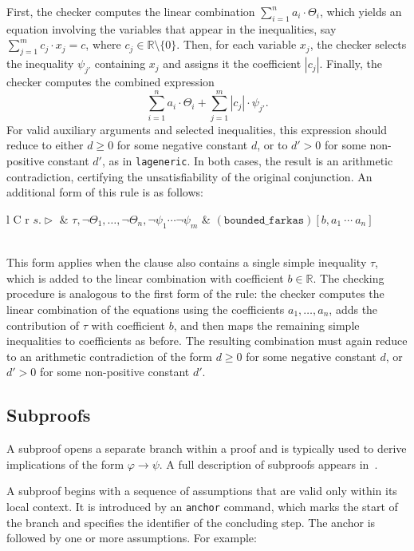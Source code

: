 First, the checker computes the linear combination
$\sum_{i=1}^{n} a_i \cdot \Theta_i$, which yields an equation involving the variables that appear in the inequalities, say
$\sum_{j=1}^{m} c_j \cdot x_j = c$,
where $c_j \in \mathbb{R}\setminus\{0\}$. Then, for each variable $x_j$, the checker selects the inequality $\psi_{j'}$ containing $x_j$ and assigns it the coefficient $|c_j|$. Finally, the checker computes the combined expression
\[
\sum_{i=1}^{n} a_i \cdot \Theta_i
+
\sum_{j=1}^{m} |c_j| \cdot \psi_{j'} .
\]
For valid auxiliary arguments and selected inequalities, this expression should reduce to either $d \geq 0$ for some negative constant $d$, or to $d' > 0$ for some non-positive constant $d'$, as in \texttt{la\textunderscore generic}. In both cases, the result is an arithmetic contradiction, certifying the unsatisfiability of the original conjunction.
An additional form of this rule is as follows:

\noindent\begin{tabularx}{\linewidth}{ l C r }
	$s.\triangleright$ & 
	$\tau,\lnot\Theta_1,\dots,\lnot\Theta_n,\lnot\psi_1\cdots\lnot\psi_m$ & 
	${\mathtt{(bounded\_farkas)}[b,a_1 \: \cdots \: a_n]}$
\end{tabularx} \\

This form applies when the clause also contains a single simple inequality $\tau$, which is added to the linear combination with coefficient $b \in \mathbb{R}$. The checking procedure is analogous to the first form of the rule: the checker computes the linear combination of the equations using the coefficients $a_1,\ldots,a_n$, adds the contribution of $\tau$ with coefficient $b$, and then maps the remaining simple inequalities to coefficients as before. The resulting combination must again reduce to an arithmetic contradiction of the form $d \geq 0$ for some negative constant $d$, or $d' > 0$ for some non-positive constant $d'$.

\subsection{Subproofs}
\label{sec:subproofs}
A subproof opens a separate branch within a proof and is typically used to derive implications of the form $\varphi \rightarrow \psi$. A full description of subproofs appears in~\cite{ScFlBaFo21}.

A subproof begins with a sequence of assumptions that are valid only within its local context. It is introduced by an \texttt{anchor} command, which marks the start of the branch and specifies the identifier of the concluding step. The anchor is followed by one or more assumptions. For example:

